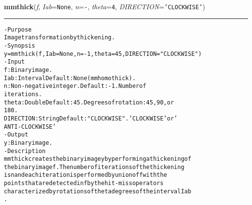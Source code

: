     \begin{boxedminipage}{\textwidth}

    \raggedright \textbf{mmthick}(\textit{f}, \textit{Iab}=\texttt{N\-o\-n\-e\-}, \textit{n}=\texttt{-\-}, \textit{theta}=\texttt{4\-}, \textit{DIRECTION}=\texttt{'\-C\-L\-O\-C\-K\-W\-I\-S\-E\-'\-})

    \vspace{-1.5ex}

    \rule{\textwidth}{0.5\fboxrule}
\begin{alltt}
- Purpose
    Image transformation by thickening.
- Synopsis
    y = mmthick(f, Iab=None, n=-1, theta=45, DIRECTION="CLOCKWISE")
- Input
    f:         Binary image.
    Iab:       Interval Default: None (mmhomothick).
    n:         Non-negative integer. Default: -1. Number of
               iterations.
    theta:     Double Default: 45. Degrees of rotation: 45, 90, or
               180.
    DIRECTION: String Default: "CLOCKWISE". 'CLOCKWISE' or '
               ANTI-CLOCKWISE'
- Output
    y: Binary image.
- Description
    mmthick creates the binary image y by performing a thickening of
    the binary image f . The number of iterations of the thickening
    is n and each iteration is performed by union of f with the
    points that are detected in f by the hit-miss operators
    characterized by rotations of theta degrees of the interval Iab
    .\end{alltt}

    \vspace{1ex}

    \end{boxedminipage}

    \label{multireg:num_pymorph:mmthin}
    \vspace{0.5ex}

